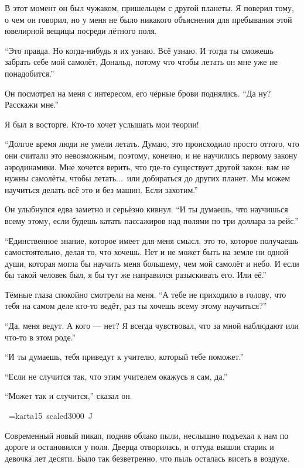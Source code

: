 В этот момент он был чужаком, пришельцем с другой планеты. Я поверил тому, о чем он говорил, но у меня не было никакого объяснения для пребывания этой ювелирной вещицы посреди лётного поля.

``Это правда. Но когда-нибудь я их узнаю. Всё узнаю. И тогда ты сможешь забрать себе мой самолёт,
 Дональд, потому что чтобы летать он мне уже не понадобится.''

Он посмотрел на меня с интересом, его чёрные брови поднялись.
``Да ну? Расскажи мне.''

Я был в восторге. Кто-то хочет услышать мои теории!

``Долгое время люди не умели летать. Думаю, это происходило просто оттого, что они считали это
невозможным, поэтому, конечно, и не научились первому закону аэродинамики. Мне хочется верить,
что где-то существует другой закон: вам не нужны самолёты, чтобы летать...\ или добираться до
других планет. Мы можем научиться делать всё это и без машин. Если захотим.''

Он улыбнулся едва заметно и серьёзно кивнул.
``И ты думаешь, что научишься всему этому, если будешь катать пассажиров над полями по три доллара за
 рейс.''

``Единственное знание, которое имеет для меня смысл, это то, которое получаешь самостоятельно,
делая то, что хочешь. Нет и не может быть на земле ни одной души, которая могла бы научить меня
большему, чем мой самолёт и небо. И если бы такой человек был, я бы тут же направился разыскивать
его. Или её.''

Тёмные глаза спокойно смотрели на меня.
``А тебе не приходило в голову, что тебя на самом деле кто-то ведёт, раз ты хочешь всему этому
 научиться?''

``Да, меня ведут. А кого --- нет? Я всегда чувствовал, что за мной наблюдают или что-то в этом роде.''

``И ты думаешь, тебя приведут к учителю, который тебе поможет.''

``Если не случится так, что этим учителем окажусь я сам, да.''

``Может так и случится,'' сказал он.

\vskip28pt
\hbox{\kern7cm \font\karta=karta15 scaled3000 \karta ^^4a}
\vskip15pt

Современный новый пикап, подняв облако пыли, неслышно подъехал к нам по дороге и остановился у поля. Дверца отворилась, и оттуда вышли старик и девочка лет десяти. Было так безветренно, что пыль осталась висеть в воздухе.

